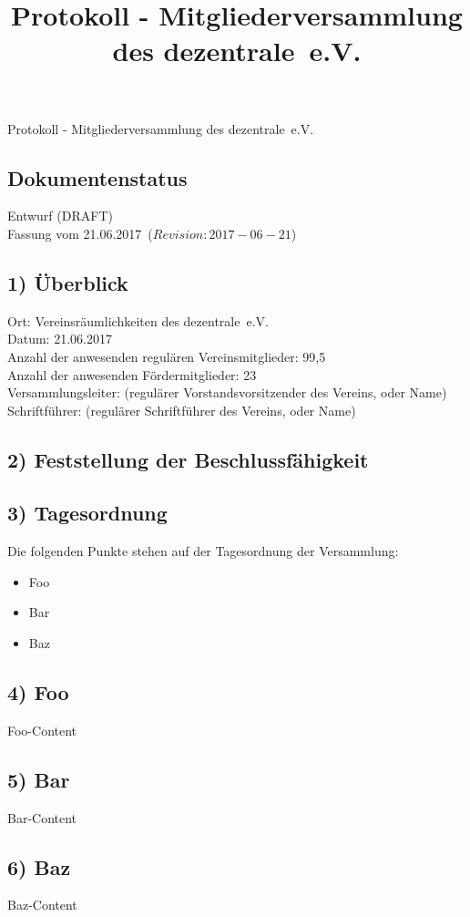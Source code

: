 \documentclass[10pt,a4paper]{scrartcl}
\newcommand{\qs}[1]{\glqq#1\grqq}
\newcommand{\name}{dezentrale}
\newcommand{\revision}{$Revision: 2017-06-21$}
\newcommand{\eventdate}{21.06.2017}
\newcommand{\versammlungsleiter}{(regul{\"a}rer Vorstandsvorsitzender des Vereins, oder Name)}
\newcommand{\schriftfuehrer}{(regul{\"a}rer Schriftf{\"u}hrer des Vereins, oder Name)}
\newcommand{\documentstatus}{Entwurf (DRAFT)}
\begin{document}
\title{Protokoll - Mitgliederversammlung des \qs{\name\ e.V.}}
{\LARGE Protokoll - Mitgliederversammlung des \qs{\name\ e.V.}}

\subsection*{Dokumentenstatus}
\documentstatus\\
Fassung vom \eventdate\ (\revision)

\subsection*{1) {\"U}berblick}
    Ort: Vereinsr{\"a}umlichkeiten des \name\ e.V.\\
    Datum: \eventdate\\
	Anzahl der anwesenden regulären Vereinsmitglieder: 99,5\\
	Anzahl der anwesenden Fördermitglieder: 23\\
    Versammlungsleiter: \versammlungsleiter\\
    Schriftf{\"u}hrer: \schriftfuehrer

\subsection*{2) Feststellung der Beschlussf{\"a}higkeit}



\subsection*{3) Tagesordnung}
    Die folgenden Punkte stehen auf der Tagesordnung der Versammlung:
	\begin{itemize}
        \item Foo
        \item Bar
        \item Baz
    \end{itemize}

\subsection*{4) Foo}
    Foo-Content

\subsection*{5) Bar}
    Bar-Content

\subsection*{6) Baz}
    Baz-Content
\end{document}
